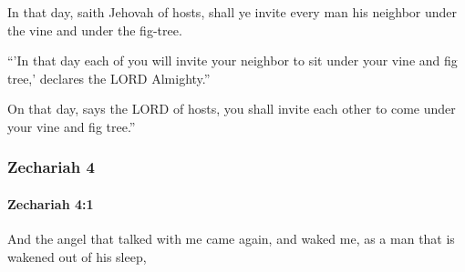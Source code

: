 			\begin{versebox}
					\item[BHS] 
					\item[LXX] 
					\item[ASV] In that day, saith Jehovah of hosts, shall ye invite every man his neighbor under the vine and under the fig-tree.
					\item[NIV] “’In that day each of you will invite your neighbor to sit under your vine and fig tree,’ declares the LORD Almighty.”
					\item[NRSV] On that day, says the LORD of hosts, you shall invite each other to come under your vine and fig tree.”
			\end{versebox}
	\subsubsection{Zechariah 4} %
		\label{ZECHARIAH-4}

		\paragraph{Zechariah 4:1} %
			\label{ZECHARIAH-4-1}

			And the angel that talked with me came again, and waked me, as a man that is wakened out of his sleep,

